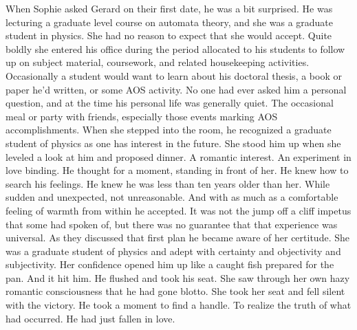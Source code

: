 

When Sophie asked Gerard on their first date, he was a bit surprised.
He was lecturing a graduate level course on automata theory, and she
was a graduate student in physics.  She had no reason to expect that
she would accept.  Quite boldly she entered his office during the
period allocated to his students to follow up on subject material,
coursework, and related housekeeping activities.  Occasionally a
student would want to learn about his doctoral thesis, a book or paper
he'd written, or some AOS activity.  No one had ever asked him a
personal question, and at the time his personal life was generally
quiet.  The occasional meal or party with friends, especially those
events marking AOS accomplishments.  When she stepped into the room,
he recognized a graduate student of physics as one has interest in the
future.  She stood him up when she leveled a look at him and proposed
dinner.  A romantic interest.  An experiment in love binding.  He
thought for a moment, standing in front of her.  He knew how to search
his feelings.  He knew he was less than ten years older than her.
While sudden and unexpected, not unreasonable.  And with as much as a
comfortable feeling of warmth from within he accepted.  It was not the
jump off a cliff impetus that some had spoken of, but there was no
guarantee that that experience was universal.  As they discussed that
first plan he became aware of her certitude.  She was a graduate
student of physics and adept with certainty and objectivity and
subjectivity.  Her confidence opened him up like a caught fish
prepared for the pan.  And it hit him.  He flushed and took his seat.
She saw through her own hazy romantic consciousness that he had gone
blotto.  She took her seat and fell silent with the victory.  He took
a moment to find a handle.  To realize the truth of what had occurred.
He had just fallen in love.

\bye
